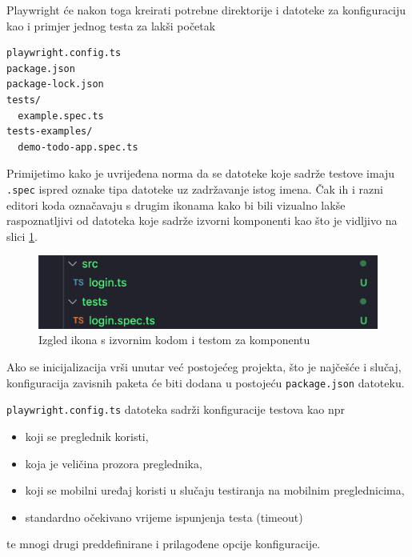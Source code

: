 Playwright će nakon toga kreirati potrebne direktorije i datoteke za konfiguraciju kao i primjer jednog testa za lakši početak
\begin{verbatim}
playwright.config.ts
package.json
package-lock.json
tests/
  example.spec.ts
tests-examples/
  demo-todo-app.spec.ts
\end{verbatim}

Primijetimo kako je uvrijeđena norma da se datoteke koje sadrže testove imaju \texttt{.spec} ispred oznake tipa datoteke uz zadržavanje istog imena. Čak ih i razni editori koda označavaju s drugim ikonama kako bi bili vizualno lakše raspoznatljivi od datoteka koje sadrže izvorni komponenti kao što je vidljivo na slici \ref{img:filesLogos}.
\begin{figure}[!h]\begin{center}
    \includegraphics[width=1\textwidth]{"img/filesLogos"}
    \caption{Izgled ikona s izvornim kodom i testom za komponentu}\label{img:filesLogos}
\end{center}\end{figure}

Ako se inicijalizacija vrši unutar već postojećeg projekta, što je najčešće i slučaj, konfiguracija zavisnih paketa će biti dodana u postojeću \texttt{package.json} datoteku.

\texttt{playwright.config.ts} datoteka sadrži konfiguracije testova kao npr 
\begin{itemize}
    \item koji se preglednik koristi, 
    \item koja je veličina prozora preglednika, 
    \item koji se mobilni uređaj koristi u slučaju testiranja na mobilnim preglednicima,
    \item standardno očekivano vrijeme ispunjenja testa (timeout)
\end{itemize}
te mnogi drugi preddefinirane i prilagođene opcije konfiguracije.

